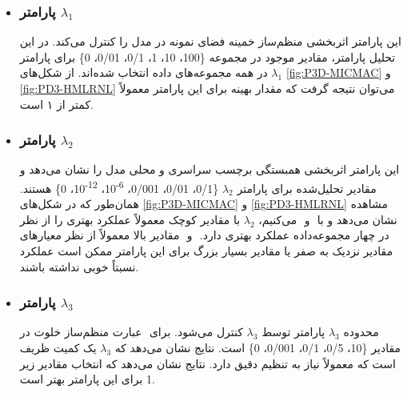 \begin{itemize}
	\item \subsubsection{ پارامتر $\lambda_1$}
	این پارامتر اثربخشی منظم‌ساز ‌خمینه فضای نمونه در مدل را کنترل  می‌کند. در این تحلیل پارامتر، مقادیر موجود در مجموعه
	\{100، 10، 1، 0/1، 0/01، 0\}
	برای پارامتر $\lambda_1$ در همه مجموعه‌های داده انتخاب شده‌اند. از شکل‌های \ref{fig:P3D-MICMAC}‎ و \ref{fig:PD3-HMLRNL} می‌توان نتیجه گرفت که مقدار بهینه برای این پارامتر معمولاً کمتر از ۱ است.
\end{itemize}
\begin{itemize}
	\item	\subsubsection{ پارامتر $\lambda_2$}
	این پارامتر اثربخشی همبستگی برچسب سراسری و محلی مدل را نشان می‌دهد و مقادیر تحلیل‌شده برای پارامتر $\lambda_2$
	\{0/1، 0/01، 0/001، \textsuperscript{6-}10، \textsuperscript{12-}10، 0\}
	هستند. همان‌طور که در شکل‌های \ref{fig:P3D-MICMAC} و \ref{fig:PD3-HMLRNL} مشاهده می‌کنیم، $\lambda_2$ با مقادیر کوچک معمولاً عملکرد بهتری را از نظر ‎‎ و ‎‎ نشان می‌دهد و با مقادیر بالا معمولاً از نظر معیارهای ‎‎ و ‎‎ در چهار مجموعه‌داده عملکرد بهتری دارد. مقادیر نزدیک به صفر یا مقادیر بسیار بزرگ برای این پارامتر ممکن است عملکرد نسبتاً خوبی نداشته باشند.
\end{itemize}

\begin{itemize}
	\item	\subsubsection{ پارامتر $\lambda_3$}
	عبارت منظم‌ساز خلوت در ‎‎ توسط $\lambda_3$ کنترل می‌شود.  برای ‎پارامتر  $\lambda_3$‎
	محدوده مقادیر
	\{10، 0/5، 0/1، 0/001، 0\}
	است. نتایج نشان می‌دهد که $\lambda_3$ یک کمیت ظریف است که معمولاً نیاز به تنظیم دقیق دارد. نتایج نشان می‌دهد که انتخاب مقادیر زیر 1 برای این پارامتر بهتر است.
\end{itemize}

